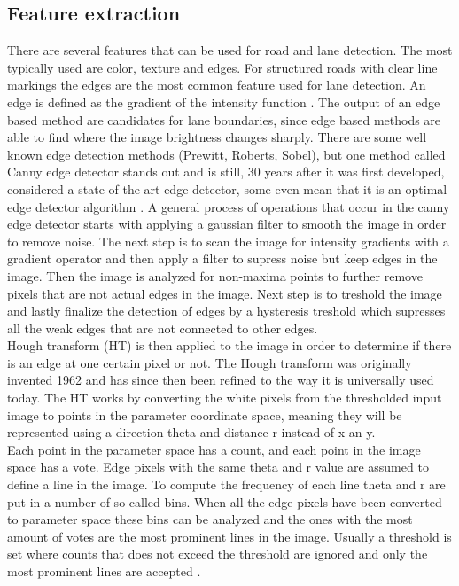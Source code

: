 \subsection{Feature extraction}
There are several features that can be used for road and lane detection. The most typically used are color, texture and edges. For structured roads with clear line markings the edges are the most common feature used for lane detection. An edge is defined as the gradient of the intensity function \cite{Yenikaya:2013:KVR:2522968.2522970}. The output of an edge based method are candidates for lane boundaries, since edge based methods are able to find where the image brightness changes sharply. There are some well known edge detection methods (Prewitt, Roberts, Sobel), but one method called Canny edge detector stands out and is still, 30 years after it was first developed, considered a state-of-the-art edge detector, some even mean that it is an optimal edge detector algorithm \cite{bhadauria2013comparison}. A general process of operations that occur in the canny edge detector starts with applying a gaussian filter to smooth the image in order to remove noise. The next step is to scan the image for intensity gradients with a gradient operator and then apply a filter to supress noise but keep edges in the image. Then the image is analyzed for non-maxima points to further remove pixels that are not actual edges in the image. Next step is to treshold the image and lastly finalize the detection of edges by a hysteresis treshold which supresses all the weak edges that are not connected to other edges.\\

Hough transform (HT) is then applied to the image in order to determine if there is an edge at one certain pixel or not. The Hough transform was originally invented 1962 and has since then been refined to the way it is universally used today. The HT works by converting the white pixels from the thresholded input image to points in the parameter coordinate space, meaning they will be represented using a direction theta and distance r instead of x an y.\\

Each point in the parameter space has a count, and each point in the image space has a vote. Edge pixels with the same theta and r value are assumed to define a line in the image. To compute the frequency of each line theta and r are put in a number of so called bins.  When all the edge pixels have been converted to parameter space these bins can be analyzed and the ones with the most amount of votes are the most prominent lines in the image. Usually a threshold is set where counts that does not exceed the threshold are ignored and only the most prominent lines are accepted \cite{davies}.

